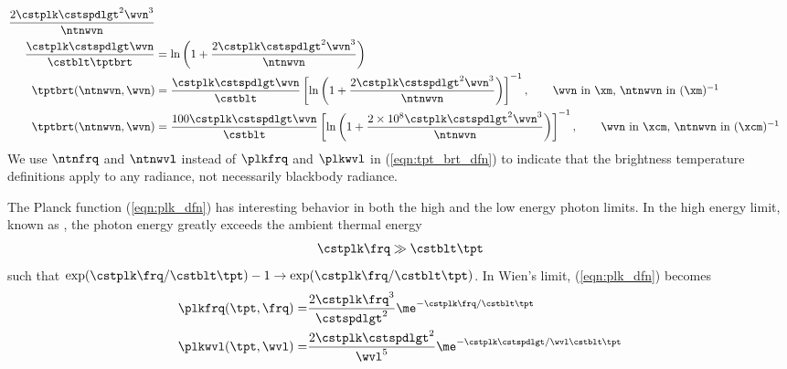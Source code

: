 \documentclass[12pt]{article}
\begin{document}
\begin{subequations}
\begin{align}
\frac{2 \cstplk \cstspdlgt^{2} \wvn^{3}}{\ntnwvn} \nonumber \\
\frac{\cstplk \cstspdlgt \wvn}{\cstblt \tptbrt} & =
\ln \left( 1 + \frac{2 \cstplk \cstspdlgt^{2} \wvn^{3}}{\ntnwvn} \right) \nonumber \\
\tptbrt(\ntnwvn,\wvn) & = \frac{\cstplk \cstspdlgt \wvn}{\cstblt}
\left[ \ln \left( 1 + \frac{2 \cstplk \cstspdlgt^{2} \wvn^{3}}{\ntnwvn} \right) \right]^{-1},
\qquad \mbox{\wvn\ in \xm, \ntnwvn\ in (\xm)$^{-1}$} \\
\label{eqn:tpt_brt_wvn_cgs_dfn}
\tptbrt(\ntnwvn,\wvn) & = \frac{100 \cstplk \cstspdlgt \wvn}{\cstblt}
\left[ \ln \left( 1 + \frac{2 \times 10^{8} \cstplk \cstspdlgt^{2} \wvn^{3}}{\ntnwvn} \right) \right]^{-1},
\qquad \mbox{\wvn\ in \xcm, \ntnwvn\ in (\xcm)$^{-1}$}
\end{align}
\end{subequations}
We use $\ntnfrq$ and $\ntnwvl$ instead of $\plkfrq$ and $\plkwvl$ in (\ref{eqn:tpt_brt_dfn})
to indicate that the brightness temperature definitions apply to any radiance, not 
necessarily blackbody radiance.

The Planck function (\ref{eqn:plk_dfn}) has interesting behavior in
both the high and the low energy photon limits. 
In the high energy limit, known as ,
the photon energy greatly exceeds the ambient thermal energy
\begin{eqnarray}
\cstplk \frq \gg \cstblt \tpt
\label{eqn:wien_dfn}
\end{eqnarray}
such that $\exp(\cstplk \frq / \cstblt \tpt) -1 \rightarrow \exp(\cstplk \frq / \cstblt \tpt)$. 
In Wien's limit, (\ref{eqn:plk_dfn}) becomes
\begin{subequations}
\label{eqn:plk_wien_dfn}
\begin{align}
\label{eqn:plk_frq_wien_dfn}
\plkfrq(\tpt,\frq) = & \frac{2 \cstplk \frq^{3}}{\cstspdlgt^{2}}
\me^{-\cstplk \frq / \cstblt \tpt} \\
\label{eqn:plk_wvl_wien_dfn}
\plkwvl(\tpt,\wvl) = & \frac{2 \cstplk \cstspdlgt^{2}}{\wvl^{5}} 
\me^{-\cstplk \cstspdlgt / \wvl \cstblt \tpt}
\end{align}
\end{subequations}
\end{document}
